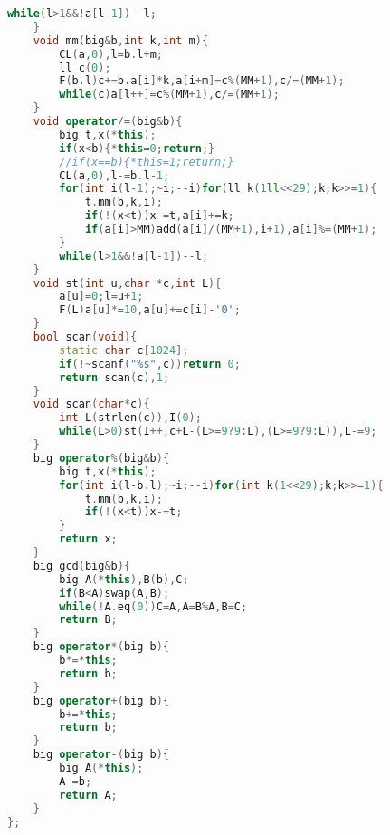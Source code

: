 \documentclass[11pt]{article}
\begin{document}
\begin{lstlisting}[language=C++]
		while(l>1&&!a[l-1])--l;
    }
    void mm(big&b,int k,int m){
        CL(a,0),l=b.l+m;
        ll c(0);
        F(b.l)c+=b.a[i]*k,a[i+m]=c%(MM+1),c/=(MM+1);
        while(c)a[l++]=c%(MM+1),c/=(MM+1);
    }
    void operator/=(big&b){
        big t,x(*this);
        if(x<b){*this=0;return;}
        //if(x==b){*this=1;return;}
        CL(a,0),l-=b.l-1;
        for(int i(l-1);~i;--i)for(ll k(1ll<<29);k;k>>=1){
            t.mm(b,k,i);
            if(!(x<t))x-=t,a[i]+=k;
            if(a[i]>MM)add(a[i]/(MM+1),i+1),a[i]%=(MM+1);
        }
        while(l>1&&!a[l-1])--l;
    }
    void st(int u,char *c,int L){
        a[u]=0;l=u+1;
        F(L)a[u]*=10,a[u]+=c[i]-'0';
    }
    bool scan(void){
        static char c[1024];
        if(!~scanf("%s",c))return 0;
        return scan(c),1;
    }
    void scan(char*c){
        int L(strlen(c)),I(0);
        while(L>0)st(I++,c+L-(L>=9?9:L),(L>=9?9:L)),L-=9;
    }
    big operator%(big&b){
        big t,x(*this);
        for(int i(l-b.l);~i;--i)for(int k(1<<29);k;k>>=1){
            t.mm(b,k,i);
            if(!(x<t))x-=t;
        }
        return x;
    }
    big gcd(big&b){
        big A(*this),B(b),C;
        if(B<A)swap(A,B);
        while(!A.eq(0))C=A,A=B%A,B=C;
        return B;
    }
    big operator*(big b){
        b*=*this;
        return b;
    }
    big operator+(big b){
        b+=*this;
        return b;
    }
    big operator-(big b){
        big A(*this);
        A-=b;
        return A;
    }
};
\end{lstlisting}
\end{document}

